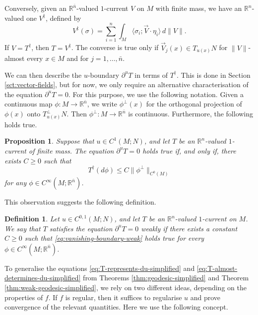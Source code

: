 \documentclass[10pt,a4paper]{amsart}
\newcommand{\R}{\mathbb{R}}
\newcommand{\ndim}{{\bar{n}}}
\newcommand{\pairing}[2]{\langle #1; #2 \rangle}
\newtheorem{proposition}[theorem]{Proposition}
\newtheorem{definition}[theorem]{Definition}
\begin{document}
Conversely, given an $\R^\ndim$-valued $1$-current $V$ on $M$ with finite mass, we have an $\R^n$-valued one $V^\ddagger$, defined by
\[
V^\ddagger(\sigma) = \sum_{i = 1}^n \int_M \pairing{\sigma_i}{\vec{V} \cdot \eta_i} \, d\|V\|.
\]
If $V = T^\dagger$, then $T = V^\ddagger$. The converse is true only if
$\vec{V}_j(x) \in T_{u(x)} N$ for $\|V\|$-almost every $x \in M$ and for
$j = 1, \dotsc, \ndim$.

We can then describe the $u$-boundary $\partial^u T$ in terms of $T^\dagger$. This is done in Section \ref{sct:vector-fields},
but for now, we only require an alternative characterisation of the equation $\partial^u T = 0$.
For this purpose, we use the following notation. Given a continuous map $\phi \colon M \to \R^\ndim$, we write $\phi^\perp(x)$ for the
orthogonal projection of $\phi(x)$ onto $T_{u(x)}^\perp N$. Then $\phi^\perp \colon M \to \R^\ndim$ is continuous.
Furthermore, the following holds true.

\begin{proposition} \label{prp:u-boundary}
Suppose that $u \in C^1(M; N)$, and let $T$ be an $\R^n$-valued $1$-current of finite mass. The equation
$\partial^u T = 0$ holds true if, and only if, there exists $C \ge 0$ such that
\begin{equation} \label{eq:vanishing-boundary-weak}
T^\dagger(d\phi) \le C \|\phi^\perp\|_{C^0(M)}
\end{equation}
for any $\phi \in C^\infty(M; \R^\ndim)$.
\end{proposition}

This observation suggests the following definition.

\begin{definition} \label{def:u-boundary}
Let $u \in C^{0, 1}(M; N)$, and let $T$ be an $\R^n$-valued $1$-current on $M$. We say that $T$ satisfies the equation $\partial^u T = 0$ \emph{weakly} if there exists a constant $C \ge 0$ such that \eqref{eq:vanishing-boundary-weak} holds true
for every $\phi \in C^\infty(M; \R^\ndim)$.
\end{definition}

To generalise the  equations \eqref{eq:T-represents-du-simplified} and \eqref{eq:T-almost-determines-du-simplified}
from Theorems \ref{thm:geodesic-simplified} and Theorem \ref{thm:weak-geodesic-simplified},
we rely on two different ideas, depending on the properties of $f$.
If $f$ is regular, then it suffices to regularise $u$ and prove convergence of the relevant quantities. Here we use the following concept.
\end{document}
